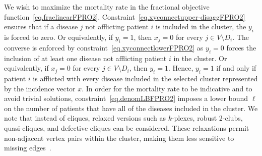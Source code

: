 We wish to maximize the   mortality rate in the fractional objective function~\eqref{eq.fraclinearFPRO2}. Constraint~\eqref{eq.xyconnectupper-disaggFPRO2} ensures that if a disease $j$ not afflicting patient $i$ is included in the cluster, the $y_i$ is forced to zero. Or equivalently, if $y_i = 1$, then $x_j = 0$ for every $j \in V\setminus D_i$. The converse is enforced by constraint~\eqref{eq.xyconnectlowerFPRO2} as $y_i = 0$ forces the inclusion of at least one disease not afflicting patient $i$ in the cluster. Or equivalently, if $x_j = 0$ for every $j \in V\setminus D_i$, then $y_i = 1$. Hence, $y_i = 1$ if and only if patient $i$ is afflicted with every disease included in the selected cluster represented by the incidence vector $x$. In order for the mortality rate to be indicative and to avoid trivial solutions, constraint~\eqref{eq.denomLBFPRO2} imposes a lower bound $\ell$ on the number of patients that have all of the  diseases included in the cluster. 
We note that instead of cliques, relaxed versions such as $k$-plexes, robust 2-clubs, quasi-cliques, and defective cliques can be considered. These relaxations permit non-adjacent vertex pairs within the cluster, making them less sensitive to missing edges~\cite{Pattillo2013CR}. 

